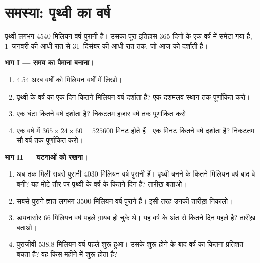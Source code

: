 \section{समस्या: पृथ्वी का वर्ष}

\begin{problem}
\label{pb:g7:geological-time:1}
पृथ्वी लगभग \num{4540} मिलियन वर्ष पुरानी है। उसका पूरा इतिहास 365 दिनों के एक
वर्ष में समेटा गया है, 1~जनवरी की आधी रात से 31~दिसंबर की आधी रात तक, जो आज को
दर्शाती है।

\medskip
\noindent\textbf{भाग I --- समय का पैमाना बनाना।}\par\nopagebreak
\begin{enumerate}[beginpenalty=10000]
  \item \num{4.54} अरब वर्षों को मिलियन वर्षों में लिखो।
  \item पृथ्वी के वर्ष का एक दिन कितने मिलियन वर्ष दर्शाता है? एक दशमलव स्थान तक
        पूर्णांकित करो।
  \item एक घंटा कितने वर्ष दर्शाता है? निकटतम हज़ार वर्ष तक
        पूर्णांकित करो।
  \item एक वर्ष में $365 \times 24 \times 60 = \num{525600}$ मिनट होते हैं। एक
        मिनट कितने वर्ष दर्शाता है? निकटतम सौ वर्ष तक
        पूर्णांकित करो।
\end{enumerate}

\medskip
\noindent\textbf{भाग II --- घटनाओं को रखना।}\par\nopagebreak
\begin{enumerate}[resume, beginpenalty=10000]
  \item अब तक मिली सबसे पुरानी  \num{4030} मिलियन वर्ष पुरानी हैं। पृथ्वी
        बनने के कितने मिलियन वर्ष बाद वे बनीं? यह मोटे तौर पर पृथ्वी के वर्ष के
        कितने दिन हैं? तारीख़ बताओ।
  \item सबसे पुराने ज्ञात  लगभग \num{3500} मिलियन वर्ष पुराने हैं। इसी तरह
        उनकी तारीख़ निकालो।
  \item डायनासोर \num{66} मिलियन वर्ष पहले ग़ायब हो चुके थे। यह वर्ष के अंत से
        कितने दिन पहले है? तारीख़ बताओ।
  \item पुराजीवी \num{538.8} मिलियन वर्ष पहले शुरू हुआ। उसके शुरू होने के बाद
        वर्ष का कितना प्रतिशत बचता है? वह किस महीने में शुरू होता
        है?
\end{enumerate}


\end{problem}
